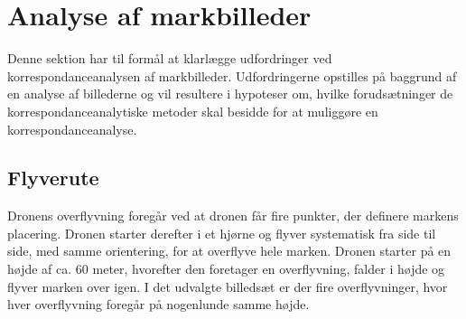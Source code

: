 \chapter{Analyse af markbilleder} \label{sec:mark}
Denne sektion har til formål at klarlægge udfordringer ved korrespondanceanalysen af markbilleder. Udfordringerne opstilles på baggrund af en analyse af billederne og vil resultere i hypoteser om, hvilke forudsætninger de korrespondanceanalytiske metoder skal besidde for at muliggøre en korrespondanceanalyse.
\section{Flyverute}
Dronens overflyvning foregår ved at dronen får fire punkter, der definere markens placering. Dronen starter derefter i et hjørne og flyver systematisk fra side til side, med samme orientering, for at overflyve hele marken. Dronen starter på en højde af ca. 60 meter, hvorefter den foretager en overflyvning, falder i højde og flyver marken over igen. I det udvalgte billedsæt er der fire overflyvninger, hvor hver overflyvning foregår på nogenlunde samme højde.
